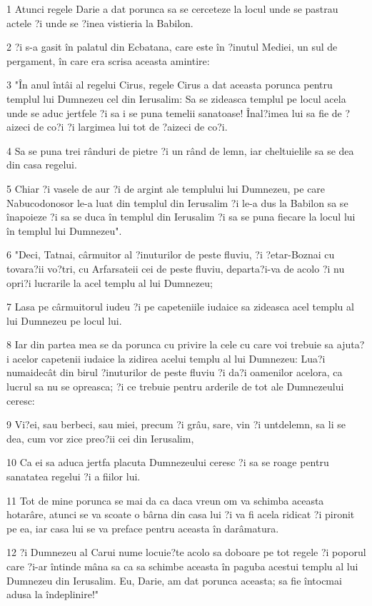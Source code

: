 \par 1 Atunci regele Darie a dat porunca sa se cerceteze la locul unde se pastrau actele ?i unde se ?inea vistieria la Babilon.
\par 2 ?i s-a gasit în palatul din Ecbatana, care este în ?inutul Mediei, un sul de pergament, în care era scrisa aceasta amintire:
\par 3 "În anul întâi al regelui Cirus, regele Cirus a dat aceasta porunca pentru templul lui Dumnezeu cel din Ierusalim: Sa se zideasca templul pe locul acela unde se aduc jertfele ?i sa i se puna temelii sanatoase! Înal?imea lui sa fie de ?aizeci de co?i ?i largimea lui tot de ?aizeci de co?i.
\par 4 Sa se puna trei rânduri de pietre ?i un rând de lemn, iar cheltuielile sa se dea din casa regelui.
\par 5 Chiar ?i vasele de aur ?i de argint ale templului lui Dumnezeu, pe care Nabucodonosor le-a luat din templul din Ierusalim ?i le-a dus la Babilon sa se înapoieze ?i sa se duca în templul din Ierusalim ?i sa se puna fiecare la locul lui în templul lui Dumnezeu".
\par 6 "Deci, Tatnai, cârmuitor al ?inuturilor de peste fluviu, ?i ?etar-Boznai cu tovara?ii vo?tri, cu Arfarsateii cei de peste fluviu, departa?i-va de acolo ?i nu opri?i lucrarile la acel templu al lui Dumnezeu;
\par 7 Lasa pe cârmuitorul iudeu ?i pe capeteniile iudaice sa zideasca acel templu al lui Dumnezeu pe locul lui.
\par 8 Iar din partea mea se da porunca cu privire la cele cu care voi trebuie sa ajuta?i acelor capetenii iudaice la zidirea acelui templu al lui Dumnezeu: Lua?i numaidecât din birul ?inuturilor de peste fluviu ?i da?i oamenilor acelora, ca lucrul sa nu se opreasca; ?i ce trebuie pentru arderile de tot ale Dumnezeului ceresc:
\par 9 Vi?ei, sau berbeci, sau miei, precum ?i grâu, sare, vin ?i untdelemn, sa li se dea, cum vor zice preo?ii cei din Ierusalim,
\par 10 Ca ei sa aduca jertfa placuta Dumnezeului ceresc ?i sa se roage pentru sanatatea regelui ?i a fiilor lui.
\par 11 Tot de mine porunca se mai da ca daca vreun om va schimba aceasta hotarâre, atunci se va scoate o bârna din casa lui ?i va fi acela ridicat ?i pironit pe ea, iar casa lui se va preface pentru aceasta în darâmatura.
\par 12 ?i Dumnezeu al Carui nume locuie?te acolo sa doboare pe tot regele ?i poporul care ?i-ar întinde mâna sa ca sa schimbe aceasta în paguba acestui templu al lui Dumnezeu din Ierusalim. Eu, Darie, am dat porunca aceasta; sa fie întocmai adusa la îndeplinire!"
